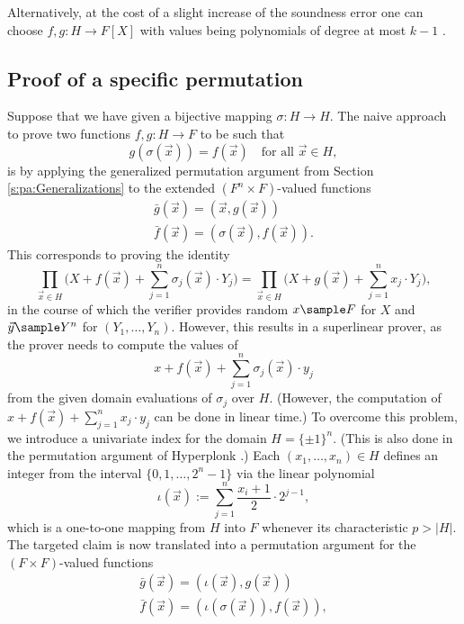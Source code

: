 \documentclass[11pt]{article}
\theoremstyle{definition}
\theoremstyle{remark}
\begin{document}
Alternatively, at the cost of a slight increase of the soundness error one can choose $f, g: H\longrightarrow F[X]$ with values being polynomials of degree at most $k-1$ . 


\subsection{Proof of a specific permutation}

Suppose that we have given a bijective mapping $\sigma: H\rightarrow H$. 
The naive approach to prove two functions $f,g: H\longrightarrow F$ to be such that 
\[
g(\sigma(\vec x)) = f(\vec x) \quad\text{for all $\vec x\in H$},
\]
is by applying the generalized permutation argument from Section \ref{s:pa:Generalizations} to the extended $(F^n\times F)$-valued functions
\begin{align*}
\bar g(\vec x) = (\vec x, g(\vec x))
\\
\bar f(\vec x) = (\sigma(\vec x), f(\vec x)).
\end{align*}
This corresponds to proving the identity
\begin{equation}
\prod_{\vec x\in H} \Big(X + f(\vec x) + \sum_{j=1}^n \sigma_{j}(\vec x)\cdot Y_j\Big) = \prod_{\vec x\in H}  \Big(X + g(\vec x) +  \sum_{j=1}^n x_j \cdot Y_j\Big),
\end{equation}
in the course of which the verifier provides random $x\sample F$ for $X$ and $\vec y\sample Y^n$ for $(Y_1,\ldots, Y_n)$.
However, this results in a superlinear prover, as the prover needs to compute the values of
\[
x + f(\vec x) +  \sum_{j=1}^n \sigma_{j}(\vec x)\cdot y_j
\]
from the given domain evaluations of $\sigma_j$ over $H$.
(However, the computation of $x + f(\vec x) +  \sum_{j=1}^n x_j \cdot y_j$ can be done in linear time.)
To overcome this problem, we introduce a univariate index for the domain $H=\{\pm 1\}^n$. 
(This is also done in the permutation argument of Hyperplonk \cite{Hyperplonk}.)
Each $(x_1,\ldots, x_n)\in H $ defines an integer from the interval $\{0,1, \ldots, 2^n -1\}$ via the linear polynomial
\begin{equation*}
\iota(\vec x) := \sum_{j=1}^n \frac{x_i + 1}{2} \cdot 2^{j-1},
\end{equation*}
which is a one-to-one mapping from $H$ into $F$ whenever its characteristic $p > |H|$.
The targeted claim is now translated into a permutation argument for the $(F\times F)$-valued functions
\begin{align*}
\bar g(\vec x) = (\iota(\vec x), g(\vec x))
\\
\bar f(\vec x) = (\iota(\sigma(\vec x)), f(\vec x)),
\end{align*}
\end{document}

